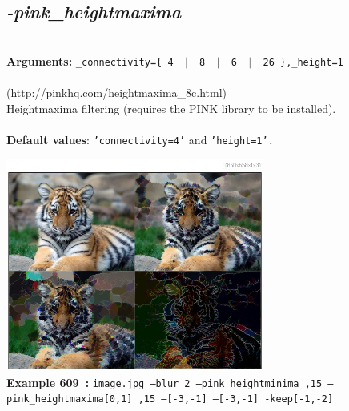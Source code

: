 \documentclass[a4paper,11pt,twoside]{book}
\begin{document}
\subsection{\emph{-pink\_heightmaxima} }\vspace*{-0.5em}
~\\\textbf{Arguments: } 
{\small \texttt{\_connectivity=\{ 4 ~$|$~ 8 ~$|$~ 6 ~$|$~ 26 \},\_height=1}}\\~\\
(http://pinkhq.com/heightmaxima\_8c.html)
~\\Heightmaxima filtering (requires the PINK library to be installed).
~\\~\\\textbf{Default values}: {\small \texttt{'connectivity=4'} and \texttt{'height=1'.}}
\begin{center}\includegraphics[keepaspectratio=true,height=7cm,width=\textwidth]{img/gmic_def609.jpg}\\
{\footnotesize \textbf{Example 609~:} \texttt{image.jpg --blur 2 --pink\_heightminima ,15 --pink\_heightmaxima[0,1] ,15 --[-3,-1] --[-3,-1] -keep[-1,-2]}}
\end{center}
\end{document}
